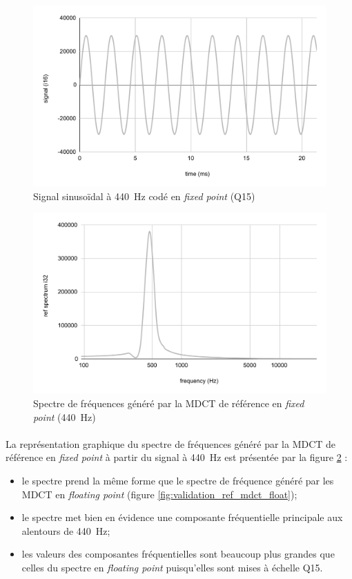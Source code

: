 \documentclass{article}
\begin{document}
    \begin{figure}[H]
        \centering
        \includegraphics[width=.8\linewidth]{./images/signal_i16.pdf}
        \caption{Signal sinusoïdal à \SI{440}{\hertz} codé en \emph{fixed point} (Q15)}
        \label{fig:signal_i16}
    \end{figure}

    \begin{figure}[H]
        \centering
        \includegraphics[width=.8\linewidth]{./images/validation_ref_int.pdf}
        \caption{Spectre de fréquences généré par la MDCT de référence en \emph{fixed point} (\SI{440}{\hertz})}
        \label{fig:validation_ref_mdct_int}
    \end{figure}

    \paragraph{}
    La représentation graphique du spectre de fréquences généré par la MDCT de référence en \emph{fixed point} à partir du signal à \SI{440}{\hertz} est présentée par la figure \ref{fig:validation_ref_mdct_int} :
    \begin{itemize}
        \item le spectre prend la même forme que le spectre de fréquence généré par les MDCT en \emph{floating point} (figure \ref{fig:validation_ref_mdct_float});
        \item le spectre met bien en évidence une composante fréquentielle principale aux alentours de \SI{440}{\hertz};
        \item les valeurs des composantes fréquentielles sont beaucoup plus grandes que celles du spectre en \emph{floating point} puisqu'elles sont mises à échelle Q15.
    \end{itemize}
\end{document}
